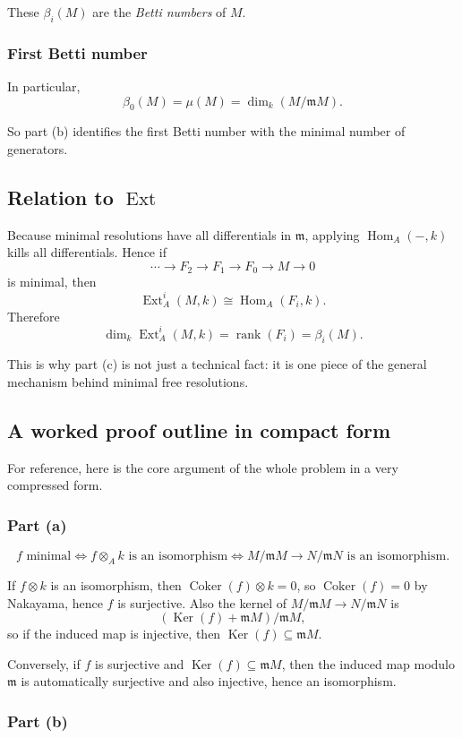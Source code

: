 \documentclass[12pt,a4paper]{article}
\theoremstyle{notespace}
\DeclareMathOperator{\Hom}{Hom}
\DeclareMathOperator{\Ker}{Ker}
\DeclareMathOperator{\Ext}{Ext}
\newcommand{\Coker}{\operatorname{Coker}}
\newcommand{\rank}{\operatorname{rank}}
\newcommand{\m}{\mathfrak m}
\begin{document}
These \(\beta_i(M)\) are the \emph{Betti numbers} of \(M\).

\subsubsection{First Betti number}

In particular,
\[
\beta_0(M)=\mu(M)=\dim_k(M/\m M).
\]

So part (b) identifies the first Betti number with the minimal number of generators.

\subsection{Relation to \(\Ext\)}

Because minimal resolutions have all differentials in \(\m\), applying \(\Hom_A(-,k)\) kills all differentials. Hence if
\[
\cdots \to F_2\to F_1\to F_0\to M\to 0
\]
is minimal, then
\[
\Ext_A^i(M,k)\cong \Hom_A(F_i,k).
\]
Therefore
\[
\dim_k \Ext_A^i(M,k)=\rank(F_i)=\beta_i(M).
\]

This is why part (c) is not just a technical fact: it is one piece of the general mechanism behind minimal free resolutions.

\subsection{A worked proof outline in compact form}

For reference, here is the core argument of the whole problem in a very compressed form.

\subsubsection{Part (a)}

\[
f \text{ minimal}
\iff
f\otimes_A k \text{ is an isomorphism}
\iff
M/\m M \to N/\m N \text{ is an isomorphism}.
\]

If \(f\otimes k\) is an isomorphism, then \(\Coker(f)\otimes k=0\), so \(\Coker(f)=0\) by Nakayama, hence \(f\) is surjective. Also the kernel of \(M/\m M\to N/\m N\) is
\[
(\Ker(f)+\m M)/\m M,
\]
so if the induced map is injective, then \(\Ker(f)\subseteq \m M\).

Conversely, if \(f\) is surjective and \(\Ker(f)\subseteq \m M\), then the induced map modulo \(\m\) is automatically surjective and also injective, hence an isomorphism.

\subsubsection{Part (b)}
\end{document}
